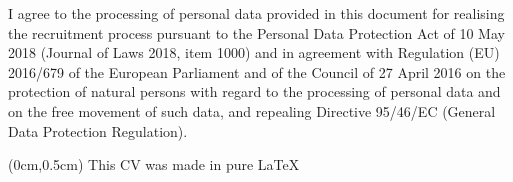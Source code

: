 \documentclass[10pt,a4paper,ragged2e,withhyper]{altacv/altacv}
\begin{document}
I agree to the processing of personal data provided in this document for realising the recruitment process pursuant to the Personal Data Protection Act of 10 May 2018 (Journal of Laws 2018, item 1000) and in agreement with Regulation (EU) 2016/679 of the European Parliament and of the Council of 27 April 2016 on the protection of natural persons with regard to the processing of personal data and on the free movement of such data, and repealing Directive 95/46/EC (General Data Protection Regulation).

\begin{textblock*}{\textwidth}(0cm,0.5cm) %
  \centering
  {\scriptsize This CV was made in pure \LaTeX}
\end{textblock*}
\end{document}
